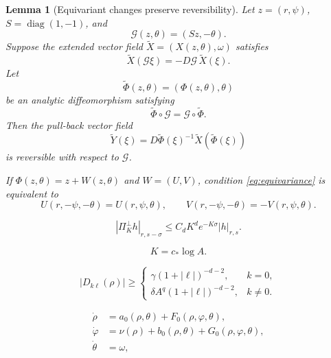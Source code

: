 \documentclass[10pt,a4paper]{amsart}
\newtheorem{lemma}{Lemma}
\begin{document}
\begin{lemma}[Equivariant changes preserve reversibility]
\label{lem:revchange}
Let $z=(r,\psi)$, $S=\operatorname{diag}(1,-1)$, and
\[
 \mathscr G(z,\theta)=(Sz,-\theta).
\]
Suppose the extended vector field
$\widetilde X=(X(z,\theta),\omega)$ satisfies
\begin{equation}\label{eq:revabstract}
 \widetilde X(\mathscr G\xi)
 =-D\mathscr G\,\widetilde X(\xi).
\end{equation}
Let
\[
 \widetilde\Phi(z,\theta)=(\Phi(z,\theta),\theta)
\]
be an analytic diffeomorphism satisfying
\begin{equation}\label{eq:equivariance}
 \widetilde\Phi\circ\mathscr G
 =\mathscr G\circ\widetilde\Phi .
\end{equation}
Then the pull-back vector field
\begin{equation}\label{eq:pullback}
 \widetilde Y(\xi)
 =D\widetilde\Phi(\xi)^{-1}
 \widetilde X(\widetilde\Phi(\xi))
\end{equation}
is reversible with respect to $\mathscr G$.

If $\Phi(z,\theta)=z+W(z,\theta)$ and $W=(U,V)$, condition
\eqref{eq:equivariance} is equivalent to
\begin{equation}\label{eq:UVequiv}
 U(r,-\psi,-\theta)=U(r,\psi,\theta),\qquad
 V(r,-\psi,-\theta)=-V(r,\psi,\theta).
\end{equation}
\end{lemma}

\begin{equation}\label{eq:Fouriertail}
 |\Pi_K^\perp h|_{r,s-\sigma}
 \leq C_d K^d e^{-K\sigma}|h|_{r,s}.
\end{equation}

\begin{equation}\label{eq:K}
 K=c_*\log A.
\end{equation}

\begin{equation}\label{eq:NR}
 |D_{k\ell}(\rho)|\geq
 \begin{cases}
 \gamma(1+|\ell|)^{-d-2},& k=0,\\[2mm]
 \delta A^q(1+|\ell|)^{-d-2},& k\neq0.
 \end{cases}
\end{equation}

\begin{equation}\label{eq:initialNF}
 \begin{aligned}
 \dot\rho&=a_0(\rho,\theta)+F_0(\rho,\varphi,\theta),\\
 \dot\varphi&=\nu(\rho)+b_0(\rho,\theta)
                   +G_0(\rho,\varphi,\theta),\\
 \dot\theta&=\omega,
 \end{aligned}
\end{equation}
\end{document}
